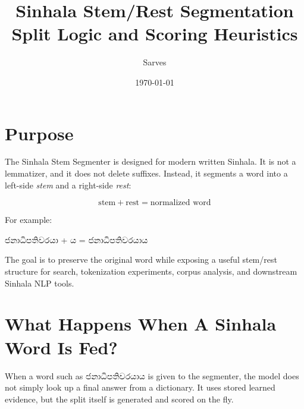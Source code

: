 \documentclass[11pt]{article}
\title{\textbf{Sinhala Stem/Rest Segmentation}\\
\large Split Logic and Scoring Heuristics}
\author{Sarves}
\date{\today}
\newcommand{\si}[1]{{\sinhalafont #1}}
\begin{document}
\maketitle

\section*{Purpose}

The Sinhala Stem Segmenter is designed for modern written Sinhala. It is not a
lemmatizer, and it does not delete suffixes. Instead, it segments a word into a
left-side \textit{stem} and a right-side \textit{rest}:

\[
\text{stem} + \text{rest} = \text{normalized word}
\]

For example:

\begin{center}
\large \si{ජනාධිපතිවරයා} + \si{ය} = \si{ජනාධිපතිවරයාය}
\end{center}

The goal is to preserve the original word while exposing a useful stem/rest
structure for search, tokenization experiments, corpus analysis, and downstream
Sinhala NLP tools.

\section*{What Happens When A Sinhala Word Is Fed?}

When a word such as \si{ජනාධිපතිවරයාය} is given to the segmenter, the model
does not simply look up a final answer from a dictionary. It uses stored learned
evidence, but the split itself is generated and scored on the fly.
\end{document}
